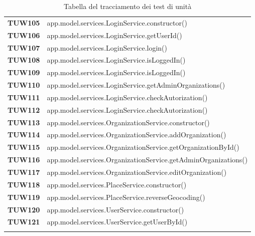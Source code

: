 \documentclass[../piano-di-qualifica.tex]{subfiles}
\begin{document}
\begin{longtable}[H]{>{\centering\bfseries}m{3cm} >{}m{13cm}}
TUW105             & app.model.services.LoginService.constructor\@()\\ 

TUW106             & app.model.services.LoginService.getUserId\@()\\ 
 
TUW107             & app.model.services.LoginService.login\@()\\ 

TUW108             & app.model.services.LoginService.isLoggedIn\@()\\ 

TUW109             & app.model.services.LoginService.isLoggedIn\@()\\ 

TUW110            & app.model.services.LoginService.getAdminOrganizations\@()\\ 

TUW111             & app.model.services.LoginService.checkAutorization\@()\\ 

TUW112             & app.model.services.LoginService.checkAutorization\@()\\ 


TUW113             & app.model.services.OrganizationService.constructor\@()\\ 

TUW114             & app.model.services.OrganizationService.addOrganization\@()\\ 

 
TUW115             & app.model.services.OrganizationService.getOrganizationById\@()\\ 

TUW116             & app.model.services.OrganizationService.getAdminOrganizations\@()\\ 

TUW117            & app.model.services.OrganizationService.editOrganization\@()\\ 



TUW118             & app.model.services.PlaceService.constructor\@()\\ 

TUW119             & app.model.services.PlaceService.reverseGeocoding\@()\\ 
 

TUW120             & app.model.services.UserService.constructor\@()\\ 

TUW121             & app.model.services.UserService.getUserById\@()\\ 



  \rowcolor{white}
  \caption{Tabella del tracciamento dei test di unità}%
  \label{tab:test_di_unità}
\end{longtable}








\end{document}

